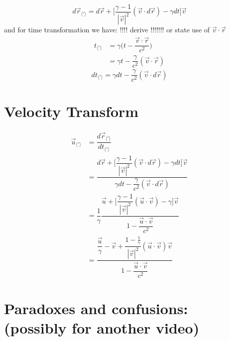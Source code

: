 \begin{equation}%
    d\vec{r}_{\langle ' \rangle}  = d\vec{r} + \Big[ \dfrac{\gamma-1}{|\vec{v}|^2}(\vec{v}\cdot d\vec{r})- \gamma dt\Big]\vec{v}
\end{equation}%
and for time transformation we have: !!!! derive !!!!!!! or state use of $\vec{v}\cdot\vec{r}$
\begin{equation}%
    \begin{split}
    t_{\langle ' \rangle}  &= \gamma \bigg( t - \dfrac{\vec{v}\cdot\vec{r}}{c^2}\bigg) \\
    &= \gamma t - \dfrac{\gamma}{c^2}(\vec{v}\cdot\vec{r})
    \end{split}
\end{equation}%
\begin{equation}%
    dt_{\langle ' \rangle}  = \gamma dt - \dfrac{\gamma}{c^2}(\vec{v}\cdot d\vec{r})
\end{equation}%

\section{Velocity Transform}
\begin{equation}%
\label{Generalised velocity transform}
    \begin{split}
    \vec{u}_{\langle ' \rangle}  &= \dfrac{d\vec{r}_{\langle ' \rangle} }{dt_{\langle ' \rangle} }\\
    &= \dfrac{d\vec{r} + \Big[ \dfrac{\gamma-1}{|\vec{v}|^2}(\vec{v}\cdot d\vec{r})- \gamma dt\Big]\vec{v}}{\gamma dt - \dfrac{\gamma}{c^2}(\vec{v}\cdot d\vec{r})} \\
    &= \dfrac{1}{\gamma} \dfrac{\vec{u} + \Big[\dfrac{\gamma-1}{|\vec{v}|^2}(\vec{u}\cdot \vec{v})- \gamma \Big] \vec{v}}{1 - \dfrac{\vec{u}\cdot\vec{v}}{c^2}}\\
    &= \dfrac{\dfrac{\vec{u}}{\gamma} - \vec{v} + \dfrac{1-\frac{1}{\gamma}}{|\vec{v}|^2}(\vec{u}\cdot \vec{v})\vec{v} }{1 - \dfrac{\vec{u}\cdot\vec{v}}{c^2}}
    \end{split}
\end{equation}%


\section{Paradoxes and confusions: (possibly for another video)}

